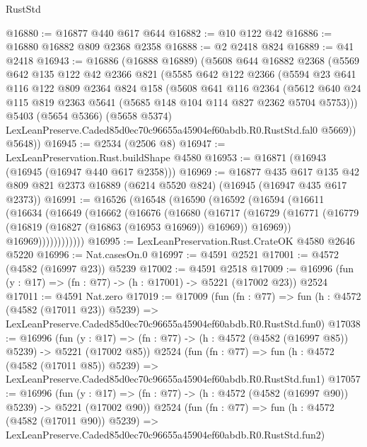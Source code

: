 \begin{lexlean}{RustStd}
\begin{coremodule}
@16880 := @16877 @440 @617 @644
@16882 := @10 @122 @42
@16886 := @16880 @16882 @809 @2368 @2358
@16888 := @2 @2418 @824
@16889 := @41 @2418
@16943 := @16886
    (@16888 @16889)
    (@5608
      @644
      @16882
      @2368
      (@5569
        @642
        @135
        @122
        @42
        @2366
        @821
        (@5585
          @642
          @122
          @2366
          (@5594
            @23
            @641
            @116
            @122
            @809
            @2364
            @824
            @158
            (@5608
              @641
              @116
              @2364
              (@5612 @640 @24 @115 @819 @2363 @5641 (@5685 @148 @104 @114 @827 @2362 @5704 @5753)))
            @5403
            (@5654 @5366)
            (@5658 @5374)
            LexLeanPreserve.Caded85d0ec70c96655a45904ef60abdb.R0.RustStd.fal0
            @5669))
        @5648))
@16945 := @2534 (@2506 @8)
@16947 := LexLeanPreservation.Rust.buildShape @4580
@16953 := @16871 (@16943 (@16945 (@16947 @440 @617 @2358)))
@16969 := @16877
    @435
    @617
    @135
    @42
    @809
    @821
    @2373
    @16889
    (@6214 @5520 @824)
    (@16945 (@16947 @435 @617 @2373))
@16991 := @16526
    (@16548
      (@16590
        (@16592
          (@16594
            (@16611
              (@16634
                (@16649
                  (@16662
                    (@16676
                      (@16680
                        (@16717
                          (@16729
                            (@16771
                              (@16779 (@16819 (@16827 (@16863 (@16953 @16969)) @16969)) @16969))
                            @16969))))))))))))
@16995 := LexLeanPreservation.Rust.CrateOK @4580 @2646 @5220
@16996 := Nat.casesOn.{0}
@16997 := @4591 @2521
@17001 := @4572 (@4582 (@16997 @23)) @5239
@17002 := @4591 @2518
@17009 := @16996 (fun (y : @17) => (fn : @77) -> (h : @17001) -> @5221 (@17002 @23)) @2524
@17011 := @4591 Nat.zero
@17019 := @17009
    (fun (fn : @77) =>
    fun (h : @4572 (@4582 (@17011 @23)) @5239) =>
    LexLeanPreserve.Caded85d0ec70c96655a45904ef60abdb.R0.RustStd.fun0)
@17038 := @16996
    (fun (y : @17) => (fn : @77) -> (h : @4572 (@4582 (@16997 @85)) @5239) -> @5221 (@17002 @85))
    @2524
    (fun (fn : @77) =>
    fun (h : @4572 (@4582 (@17011 @85)) @5239) =>
    LexLeanPreserve.Caded85d0ec70c96655a45904ef60abdb.R0.RustStd.fun1)
@17057 := @16996
    (fun (y : @17) => (fn : @77) -> (h : @4572 (@4582 (@16997 @90)) @5239) -> @5221 (@17002 @90))
    @2524
    (fun (fn : @77) =>
    fun (h : @4572 (@4582 (@17011 @90)) @5239) =>
    LexLeanPreserve.Caded85d0ec70c96655a45904ef60abdb.R0.RustStd.fun2)

\end{coremodule}
\end{lexlean}
